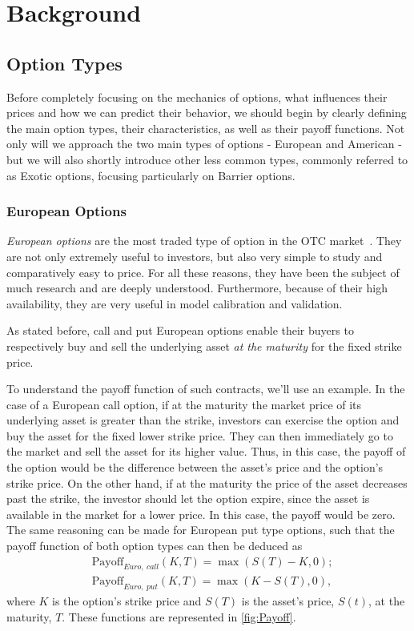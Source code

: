 \chapter{Background}
\label{chapter:background}
\section{Option Types}
Before completely focusing on the mechanics of options, what influences their prices and how we can predict their behavior, we should begin by clearly defining the main option types, their characteristics, as well as their payoff functions. Not only will we approach the two main types of options - European and American - but we will also shortly introduce other less common types, commonly referred to as Exotic options, focusing particularly on Barrier options.



\subsection{European Options}
\emph{European options} are the most traded type of option in the OTC market~\citep{InvEuro}. They are not only extremely useful to investors, but also very simple to study and comparatively easy to price. For all these reasons, they have been the subject of much research and are deeply understood. Furthermore, because of their high availability, they are very useful in model calibration and validation.


As stated before, call and put European options enable their buyers to respectively buy and sell the underlying asset \emph{at the maturity} for the fixed strike price.

To understand the payoff function of such contracts, we'll use an example. In the case of a European call option, if at the maturity the market price of its underlying asset is greater than the strike, investors can exercise the option and buy the asset for the fixed lower strike price. They can then immediately go to the market and sell the asset for its higher value. Thus, in this case, the payoff of the option would be the difference between the asset's price and the option's strike price. On the other hand, if at the maturity the price of the asset decreases past the strike, the investor should let the option expire, since the asset is available in the market for a lower price. In this case, the payoff would be zero.
The same reasoning can be made for European put type options, such that the payoff function of both option types can then be deduced as
\begin{equation}\label{callput}
\begin{split}
&\text{Payoff}_{Euro,\ call}(K,T)=\max\left(S(T)-K,0\right);\\
&\text{Payoff}_{Euro,\ put}(K,T)=\max\left(K-S(T),0\right),
\end{split}
\end{equation}
\noindent where $K$ is the option's strike price and $S(T)$ is the asset's price, $S(t)$, at the maturity, $T$. These functions are represented in \autoref{fig:Payoff}.

